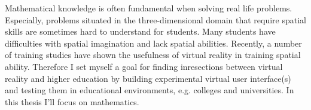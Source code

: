 \documentclass[]{tukethesis}
\begin{document}
\preface %
Mathematical knowledge is often fundamental when solving real life problems. Especially, problems situated in the three-dimensional domain that require spatial skills are sometimes hard to understand for students. Many students have difficulties with spatial imagination and lack spatial abilities. Recently, a number of training studies have shown the usefulness of virtual reality in training spatial ability. Therefore I set myself a goal for finding inresections between virtual reality and higher education by building experimental virtual user interface(s) and testing them in educational environments, e.g. colleges and universities. In this thesis I'll focus on mathematics.
\endpreface

\thispagestyle{empty}
\tableofcontents
\newpage

\thispagestyle{empty}
\listoffigures
\newpage


\thispagestyle{empty}

\listofterms %

\begin{description}
\end{description}
\end{document}
